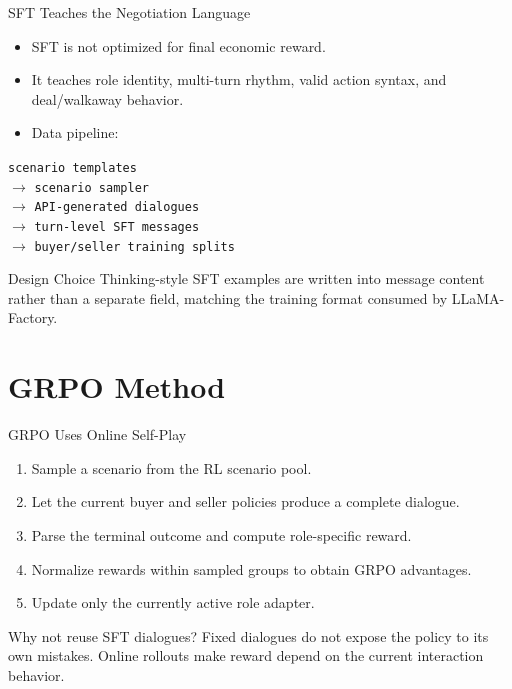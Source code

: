 \documentclass{beamer}
\begin{document}
\begin{frame}{SFT Teaches the Negotiation Language}
\begin{itemize}
    \item SFT is not optimized for final economic reward.
    \item It teaches role identity, multi-turn rhythm, valid action syntax, and
    deal/walkaway behavior.
    \item Data pipeline:
\end{itemize}
\vspace{0.15cm}
\begin{center}
\small
\texttt{scenario templates}\\
$\rightarrow$ \texttt{scenario sampler}\\
$\rightarrow$ \texttt{API-generated dialogues}\\
$\rightarrow$ \texttt{turn-level SFT messages}\\
$\rightarrow$ \texttt{buyer/seller training splits}
\end{center}
\vspace{0.15cm}
\begin{block}{Design Choice}
Thinking-style SFT examples are written into message content rather than a
separate field, matching the training format consumed by LLaMA-Factory.
\end{block}
\end{frame}

\section{GRPO Method}

\begin{frame}{GRPO Uses Online Self-Play}
\begin{enumerate}
    \item Sample a scenario from the RL scenario pool.
    \item Let the current buyer and seller policies produce a complete dialogue.
    \item Parse the terminal outcome and compute role-specific reward.
    \item Normalize rewards within sampled groups to obtain GRPO advantages.
    \item Update only the currently active role adapter.
\end{enumerate}
\vspace{0.2cm}
\begin{block}{Why not reuse SFT dialogues?}
Fixed dialogues do not expose the policy to its own mistakes. Online rollouts
make reward depend on the current interaction behavior.
\end{block}
\end{frame}
\end{document}
